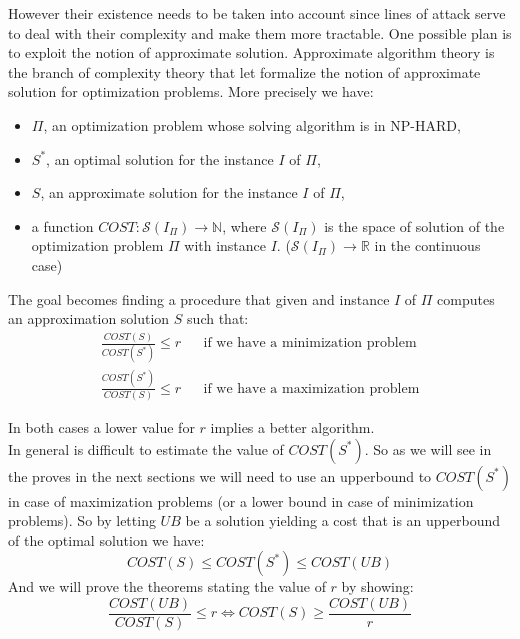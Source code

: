 However their existence needs to be taken into account since lines of attack serve to deal with their complexity and make them more tractable.
One possible plan is to exploit the notion of approximate solution.
Approximate algorithm theory is the branch of complexity theory that let formalize the notion of approximate solution for optimization problems.
More precisely we have:
\begin{itemize}
	\item $ \Pi $, an optimization problem whose solving algorithm is in NP-HARD,
	\item $ S^{*} $, an optimal solution for the instance $ I $ of $ \Pi $,
	\item $ S $, an approximate solution for the instance $ I $ of $ \Pi $,
	\item a function $ COST: \mathcal{S}(I_{\Pi}) \rightarrow \mathbb{N} $, where $ \mathcal{S}(I_{\Pi})$ is the space of solution of the optimization problem $ \Pi $ with instance $ I $. ($ \mathcal{S}(I_{\Pi}) \rightarrow \mathbb{R} $ in the continuous case)
\end{itemize}
The goal becomes finding a procedure that given and instance $ I $ of $ \Pi $ computes an approximation solution $ S $ such that:
\begin{align}
	\frac{COST(S)}{COST(S^*)} \leq r && \text{if we have a minimization problem} \\
	\frac{COST(S^*)}{COST(S)} \leq r && \text{if we have a maximization problem}
\end{align}

In both cases a lower value for $ r $ implies a better algorithm.\\
In general is difficult to estimate the value of $ COST(S^{*}) $. So as we will see in the proves in the next sections we will need to use an upperbound to $ COST(S^{*}) $ in case of 
maximization problems (or a lower bound in case of minimization problems). 
So by letting $ UB $ be a solution yielding a cost that is an upperbound of the optimal solution we have:
\[ COST(S) \leq COST(S^{*}) \leq COST(UB) \]
And we will prove the theorems stating the value of $ r $ by showing:
\[ 
\frac{COST(UB)}{COST(S)} \leq r 
\Longleftrightarrow
COST(S) \geq \frac{COST(UB)}{r} \]